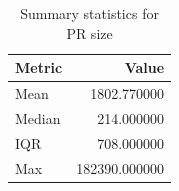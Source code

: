 \begin{table}
\caption{Summary statistics for PR size}
\label{tab:pr-size-summary}
\begin{tabular}{lr}
\toprule
Metric & Value \\
\midrule
Mean & 1802.770000 \\
Median & 214.000000 \\
IQR & 708.000000 \\
Max & 182390.000000 \\
\bottomrule
\end{tabular}
\end{table}
